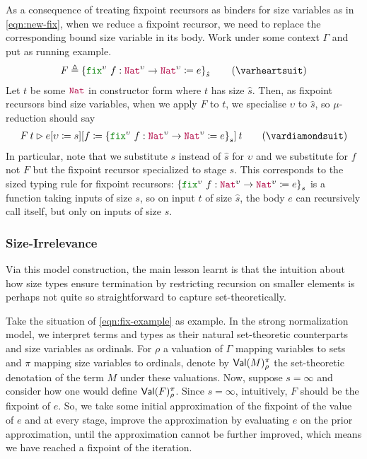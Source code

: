 As a consequence of treating fixpoint recursors as binders for size
variables as in \eqref{eqn:new-fix}, when we reduce a fixpoint
recursor, we need to replace the corresponding bound size variable in
its body.
%
Work under some context $\Gamma$ and put as running example.
%
\begin{align*}
  F \triangleq \left\{\kw{fix}^\upsilon ~ f : \Nat^\upsilon \to \Nat^\upsilon \coloneqq e\right\}_{\hat{s}}
  \label{eqn:fix-example}\tag{$\varheartsuit$}
\end{align*}
%
Let $t$ be some $\Nat$ in constructor form where $t$ has size
$\hat{s}$.
%
Then, as fixpoint recursors bind size variables, when we apply $F$ to
$t$, we specialise $\upsilon$ to $\hat{s}$, so $\mu$-reduction should
say
%
\begin{align*}
  \app{F}{t} \rhd \app{\subst{\subst{e}{\upsilon}{s}}{f}{
  \left\{\kw{fix}^\upsilon ~ f : \Nat^\upsilon \to \Nat^\upsilon \coloneqq e\right\}_{s}
  }}{t}
  \label{eqn:mu-example}\tag{$\vardiamondsuit$}
\end{align*}
%
In particular, note that we substitute $s$ instead of $\hat{s}$ for
$\upsilon$ and we substitute for $f$ not $F$ but the fixpoint recursor
specialized to stage $s$.
%
This corresponds to the sized typing rule for fixpoint recursors:
$\left\{\kw{fix}^\upsilon ~ f : \Nat^\upsilon \to \Nat^\upsilon
  \coloneqq e\right\}_{s}$ is a function taking inputs of size $s$, so
on input $t$ of size $\hat{s}$, the body $e$ can recursively call
itself, but only on inputs of size $s$.

\subsubsection{Size-Irrelevance}
%
Via this model construction, the main lesson learnt is
that the intuition about how size types ensure termination by
restricting recursion on smaller elements is perhaps not quite so
straightforward to capture set-theoretically.

Take the situation of \eqref{eqn:fix-example} as example.
%
In the strong normalization model, we interpret terms and types as
their natural set-theoretic counterparts and size variables as
ordinals.
%
For $\rho$ a valuation of $\Gamma$ mapping variables to sets and $\pi$
mapping size variables to ordinals, denote by $\textsf{Val}(M)_\rho^\pi$ the
set-theoretic denotation of the term $M$ under these valuations.
%
Now, suppose $s=\infty$ and consider how one would define
$\textsf{Val}(F)_\rho^\pi$.
%
Since $s=\infty$, intuitively, $F$ should be the fixpoint of $e$.
%
So, we take some initial approximation of the fixpoint of the value of
$e$ and at every stage, improve the approximation by evaluating $e$ on
the prior approximation, until the approximation cannot be further
improved, which means we have reached a fixpoint of the iteration.

